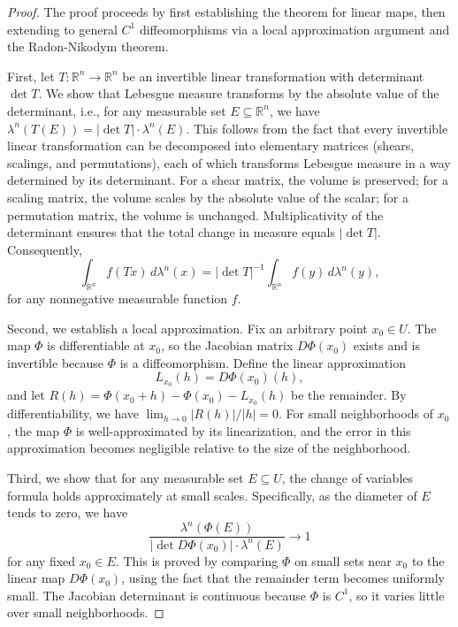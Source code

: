 \begin{proof}
The proof proceeds by first establishing the theorem for linear maps, then extending to general $C^1$ diffeomorphisms via a local approximation argument and the Radon-Nikodym theorem.

First, let $T : \mathbb{R}^n \to \mathbb{R}^n$ be an invertible linear transformation with determinant $\det T$. We show that Lebesgue measure transforms by the absolute value of the determinant, i.e., for any measurable set $E \subseteq \mathbb{R}^n$, we have $\lambda^n(T(E)) = |\det T| \cdot \lambda^n(E)$. This follows from the fact that every invertible linear transformation can be decomposed into elementary matrices (shears, scalings, and permutations), each of which transforms Lebesgue measure in a way determined by its determinant. For a shear matrix, the volume is preserved; for a scaling matrix, the volume scales by the absolute value of the scalar; for a permutation matrix, the volume is unchanged. Multiplicativity of the determinant  ensures that the total change in measure equals $|\det T|$. Consequently,
$$\int_{\mathbb{R}^n} f(Tx)\,d\lambda^n(x) = |\det T|^{-1} \int_{\mathbb{R}^n} f(y)\,d\lambda^n(y),$$
for any nonnegative measurable function $f$.

Second, we establish a local approximation. Fix an arbitrary point $x_0 \in U$. The map $\Phi$ is differentiable at $x_0$, so the Jacobian matrix $D\Phi(x_0)$ exists and is invertible because $\Phi$ is a diffeomorphism. Define the linear approximation
$$L_{x_0}(h) = D\Phi(x_0)(h),$$
and let $R(h) = \Phi(x_0 + h) - \Phi(x_0) - L_{x_0}(h)$ be the remainder. By differentiability, we have $\lim_{h \to 0} |R(h)| / |h| = 0$. For small neighborhoods of $x_0$, the map $\Phi$ is well-approximated by its linearization, and the error in this approximation becomes negligible relative to the size of the neighborhood.

Third, we show that for any measurable set $E \subseteq U$, the change of variables formula holds approximately at small scales. Specifically, as the diameter of $E$ tends to zero, we have
$$\frac{\lambda^n(\Phi(E))}{|\det D\Phi(x_0)| \cdot \lambda^n(E)} \to 1$$
for any fixed $x_0 \in E$. This is proved by comparing $\Phi$ on small sets near $x_0$ to the linear map $D\Phi(x_0)$, using the fact that the remainder term becomes uniformly small. The Jacobian determinant is continuous because $\Phi$ is $C^1$, so it varies little over small neighborhoods.


\end{proof}
